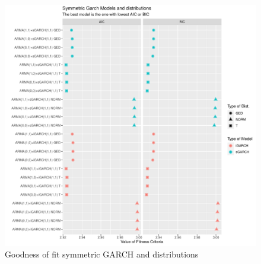 \documentclass[
]{article}
\begin{document}
\begin{figure}

{\centering \includegraphics[width=1\linewidth]{symmetric aics} 

}

\caption{Goodness of fit symmetric GARCH and distributions}\label{fig:aic1}
\end{figure}
\end{document}
